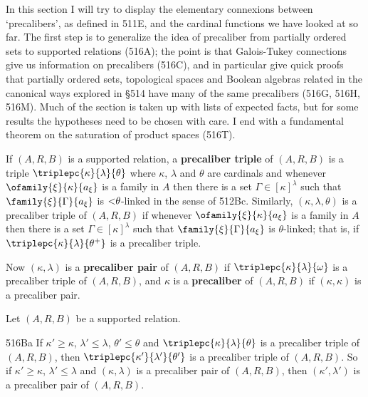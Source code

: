 
\def\chaptername{Cardinal functions}
\def\sectionname{Precalibers}


In this section I will try to display the elementary connexions between
`precalibers', as defined in 511E, and the cardinal functions we have
looked at so far.
The first step is to generalize the idea of precaliber from partially
ordered sets to supported relations (516A);  the point is that
Galois-Tukey connections give us information on precalibers (516C), and
in particular give quick proofs that partially ordered sets, topological
spaces and Boolean algebras related in the canonical ways explored in
\S514 have many of the same precalibers (516G, 516H, 516M).
Much of the section is taken up with lists of expected facts, but for
some results the hypotheses need to be chosen with care.   I end with a
fundamental theorem on the saturation of product spaces (516T).

 If $(A,R,B)$ is a supported relation, a
{\bf precaliber triple} of $(A,R,B)$ is a triple
$\triplepc{\kappa}{\lambda}{\theta}$
where $\kappa$, $\lambda$ and $\theta$ are cardinals and whenever
$\ofamily{\xi}{\kappa}{a_{\xi}}$ is a family in $A$ then there is a set
$\Gamma\in[\kappa]^{\lambda}$ such that $\family{\xi}{\Gamma}{a_{\xi}}$
is $\hbox{$<$}\theta$-linked in the sense of 512Bc.   Similarly,
$(\kappa,\lambda,\theta)$ is a precaliber triple of $(A,R,B)$ if
whenever $\ofamily{\xi}{\kappa}{a_{\xi}}$ is a family in $A$ then there
is a set $\Gamma\in[\kappa]^{\lambda}$ such that
$\family{\xi}{\Gamma}{a_{\xi}}$ is $\theta$-linked;  that is,
if $\triplepc{\kappa}{\lambda}{\theta^+}$ is a precaliber triple.

Now $(\kappa,\lambda)$ is a {\bf precaliber pair} of $(A,R,B)$ if
$\triplepc{\kappa}{\lambda}{\omega}$ is a precaliber triple of
$(A,R,B)$, and $\kappa$ is a {\bf precaliber} of $(A,R,B)$ if
$(\kappa,\kappa)$ is a precaliber pair.

Let $(A,R,B)$ be a supported relation.

\spheader 516Ba If $\kappa'\ge\kappa$, $\lambda'\le\lambda$,
$\theta'\le\theta$ and $\triplepc{\kappa}{\lambda}{\theta}$ is a
precaliber triple of $(A,R,B)$, then
$\triplepc{\kappa'}{\lambda'}{\theta'}$ is a precaliber triple of
$(A,R,B)$.   So if $\kappa'\ge\kappa$, $\lambda'\le\lambda$ and
$(\kappa,\lambda)$ is a precaliber pair of $(A,R,B)$, then
$(\kappa',\lambda')$ is a precaliber pair of $(A,R,B)$.

